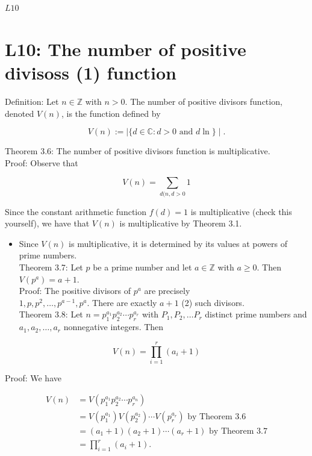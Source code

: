 \documentclass[10pt]{article}
\begin{document}
$L 10$

\section*{L10: The number of positive divisoss (1) function}
Definition: Let $n \in \mathbb{Z}$ with $n>0$. The number of positive divisors function, denoted $V(n)$, is the function defined by

$$
V(n):=\mid\{d \in \mathbb{C}: d>0 \text { and } d \ln \} \mid .
$$

Theorem 3.6: The number of positive divisors function is multiplicative.\\
Proof: Observe that

$$
V(n)=\sum_{d(n, d>0} 1
$$

Since the constant arithmetic function $f(d)=1$ is multiplicative (check this yourself), we have that $V(n)$ is multiplicative by Theorem 3.1.

\begin{itemize}
  \item Since $V(n)$ is multiplicative, it is determined by its values at powers of prime numbers.\\
Theorem 3.7: Let $p$ be a prime number and let $a \in \mathbb{Z}$ with $a \geqslant 0$. Then $V\left(p^{a}\right)=a+1$.\\
Proof: The positive divisors of $p^{a}$ are precisely\\
$1, p, p^{2}, \ldots, p^{a-1}, p^{a}$. There are exactly $a+1$ (2) such divisors.\\
Theorem 3.8: Let $n=p_{1}^{a_{1}} p_{2}^{a_{2}} \cdots p_{r}^{a_{r}}$ with $P_{1}, P_{2}, \ldots P_{r}$ distinct prime numbers and $a_{1}, a_{2}, \ldots, a_{r}$ nonnegative integers. Then
\end{itemize}

$$
V(n)=\prod_{i=1}^{r}\left(a_{i}+1\right)
$$

Proof: We have

$$
\begin{aligned}
V(n) & =V\left(p_{1}^{a_{1}} p_{2}^{a_{2}} \cdots p_{r}^{a_{n}}\right) \\
& =V\left(p_{1}^{a_{1}}\right) V\left(p_{2}^{a_{2}}\right) \cdots V\left(p_{r}^{a_{r}}\right) \text { by Theorem } 3.6 \\
& =\left(a_{1}+1\right)\left(a_{2}+1\right) \cdots\left(a_{r}+1\right) \text { by Theorem } 3.7 \\
& =\prod_{i=1}^{r}\left(a_{i}+1\right) .
\end{aligned}
$$
\end{document}
